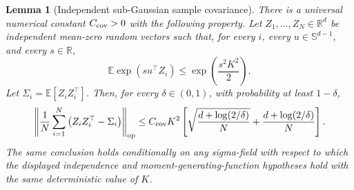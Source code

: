\documentclass{article} %
\newtheorem{lemma}[theorem]{Lemma}
\begin{document}
\begin{lemma}[Independent sub-Gaussian sample covariance]
\label{lem:err-control-independent-subg-cov-final}
There is a universal numerical constant \(C_{\rm cov}>0\) with the following
property.  Let \(Z_1,\ldots,Z_N\in\mathbb{R}^d\) be independent mean-zero random
vectors such that, for every \(i\), every \(u\in\mathbb{S}^{d-1}\), and every
\(s\in\mathbb{R}\),
\begin{equation}
\mathbb{E}\exp(su^\top Z_i)
\leq
\exp\!\left(\frac{s^2K^2}{2}\right).
\end{equation}
Let \(\Sigma_i=\mathbb{E}[Z_iZ_i^\top]\). Then, for every
\(\delta\in(0,1)\), with probability at least \(1-\delta\),
\begin{equation}
\left\|
\frac1N\sum_{i=1}^N
\left(Z_iZ_i^\top-\Sigma_i\right)
\right\|_{\mathrm{op}}
\leq
C_{\rm cov}K^2
\left[
\sqrt{\frac{d+\log(2/\delta)}{N}}
+
\frac{d+\log(2/\delta)}{N}
\right].
\end{equation}
The same conclusion holds conditionally on any sigma-field with respect to
which the displayed independence and moment-generating-function hypotheses hold
with the same deterministic value of \(K\).
\end{lemma}
\end{document}
